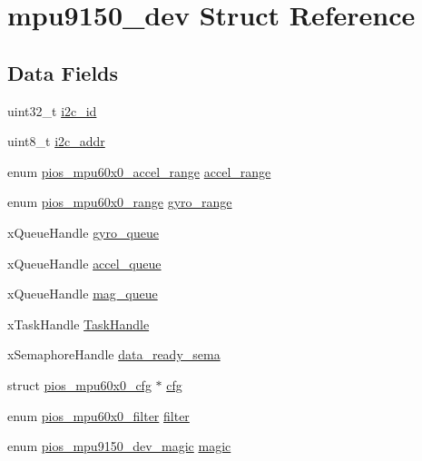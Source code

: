 \hypertarget{structmpu9150__dev}{\section{mpu9150\-\_\-dev \-Struct \-Reference}
\label{structmpu9150__dev}
}
\subsection*{\-Data \-Fields}
\begin{DoxyCompactItemize}
\item 
uint32\-\_\-t \hyperlink{structmpu9150__dev_a21914e4ea5e4f5c302527a1c792612ae}{i2c\-\_\-id}
\item 
uint8\-\_\-t \hyperlink{structmpu9150__dev_a2fbefbe5feaf41acd2fa2f38d9659d9b}{i2c\-\_\-addr}
\item 
enum \hyperlink{group___p_i_o_s___m_p_u60_x0_ga8f297bddae3eb43bbf7b54abc6494992}{pios\-\_\-mpu60x0\-\_\-accel\-\_\-range} \hyperlink{structmpu9150__dev_a94560142ddd8f04665c54db25dec298e}{accel\-\_\-range}
\item 
enum \hyperlink{group___p_i_o_s___m_p_u60_x0_ga56700b0154a14cf67c9f8f44a86ad9c0}{pios\-\_\-mpu60x0\-\_\-range} \hyperlink{structmpu9150__dev_a5b09effc92ea527ca1c143edbd631f38}{gyro\-\_\-range}
\item 
x\-Queue\-Handle \hyperlink{structmpu9150__dev_a64adb1a56859fd674c9ab40800c51c67}{gyro\-\_\-queue}
\item 
x\-Queue\-Handle \hyperlink{structmpu9150__dev_a0479e62f94e5c609f61aed2bacc34c16}{accel\-\_\-queue}
\item 
x\-Queue\-Handle \hyperlink{structmpu9150__dev_aaa1a539bd8e174c5a35c1abbc58c7c14}{mag\-\_\-queue}
\item 
x\-Task\-Handle \hyperlink{structmpu9150__dev_a07df540feb0b5cfc8c3e1ba77da60293}{\-Task\-Handle}
\item 
x\-Semaphore\-Handle \hyperlink{structmpu9150__dev_a28bcee6727b79ac6759680b8f8124c53}{data\-\_\-ready\-\_\-sema}
\item 
struct \hyperlink{structpios__mpu60x0__cfg}{pios\-\_\-mpu60x0\-\_\-cfg} $\ast$ \hyperlink{structmpu9150__dev_a4580e544e9fab8e6853bdeee1ef58de1}{cfg}
\item 
enum \hyperlink{group___p_i_o_s___m_p_u60_x0_gacce1988bc994f5ade6ac748c2bf0b924}{pios\-\_\-mpu60x0\-\_\-filter} \hyperlink{structmpu9150__dev_add26a550633bea24f7d02c827a8032e8}{filter}
\item 
enum \hyperlink{group___p_i_o_s___m_p_u9150_ga2924f0a0ab14681967b9e7f1e72e1c46}{pios\-\_\-mpu9150\-\_\-dev\-\_\-magic} \hyperlink{structmpu9150__dev_a1df6dd07def8299af2a38817a216e8e2}{magic}
\end{DoxyCompactItemize}


